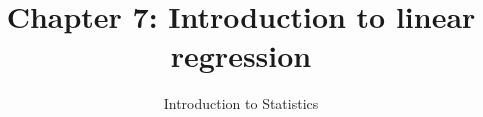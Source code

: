 \documentclass[slidestop,compress,mathserif]{beamer}
\title[Chp 7: Intro. to linear regression]{Chapter 7: Introduction to linear regression}
\author{Introduction to Statistics}
\date{}
\institute{}
\begin{document}


\begin{frame}[plain]

\titlepage

\end{frame}








\end{document}
